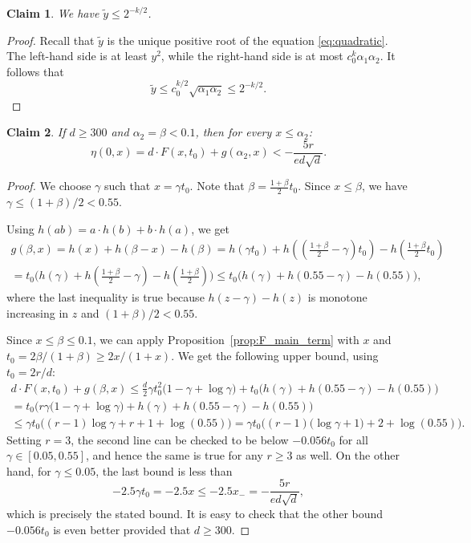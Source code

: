\documentclass[12pt]{amsart}
\newtheorem*{claim*}{Claim}
\theoremstyle{definition}
\newcommand\yt{\widetilde{y}}
\newcommand\al{\alpha}
\newcommand\be{\beta}
\newcommand\ga{\gamma}
\begin{document}
%
\begin{claim*}
We have $\yt \leq 2^{-k/2}$.
\end{claim*}
%
\begin{proof}
Recall that $\yt$ is the unique positive root of the equation \eqref{eq:quadratic}. The left-hand side is at least $y^2$, while the right-hand side is at most $c_0^k \al_1 \al_2$. It follows that 
%
\[ \yt \leq c_0^{k/2} \sqrt{\al_1 \al_2} \leq 2^{-k/2} .\]
%
\end{proof}
%
\begin{claim*}
If $d \geq 300$ and $\al_2=\be < 0.1$, then for every $x \leq \al_2$:
\[ \eta(0,x) = d \cdot F(x,t_0) + g(\al_2,x)
< - \frac{5r}{e d\sqrt{d}} .\]
\end{claim*}
%
\begin{proof}
We choose $\ga$ such that $x = \ga t_0$. Note that $\be= \frac{1+\be}{2} t_0$. Since $x\leq \be$, we have $\ga \leq (1+\be)/2 < 0.55$. 

Using $h(ab)=a \cdot h(b) + b \cdot h(a)$, we get 
%
\begin{multline*}
g(\be,x) = h(x)+h(\be-x)-h(\be)  
= h(\ga t_0)
+ h\left( \left(\frac{1+\be}{2}-\ga\right)t_0 \right)
- h\left( \frac{1+\be}{2} t_0 \right) \\
= t_0 \bigg( h(\ga)
+h\left(\frac{1+\be}{2}-\ga\right)
-h\left(\frac{1+\be}{2}\right) \bigg) 
\leq t_0 \bigg( h(\ga)
+h\left(0.55-\ga\right)
-h\left(0.55\right) \bigg) ,
\end{multline*}
%
where the last inequality is true because $h(z-\ga)-h(z)$ is monotone increasing in $z$ and $(1+\be)/2 < 0.55$.

Since $x \leq \be \leq 0.1$, we can apply Proposition~\ref{prop:F_main_term} with $x$ and $t_0=2\be/(1+\be) \geq 2x/(1+x)$. We get the following upper bound, using $t_0=2r/d$:
%
\begin{multline*}
d \cdot F(x,t_0) + g(\be,x) \leq 
\frac{d}{2}\ga t_0^2 \big( 1- \ga + \log \ga \big) + 
t_0 \bigg( h(\ga)+h(0.55-\ga)-h(0.55) \bigg) \\
= t_0 \bigg( r\ga \big( 1- \ga + \log \ga \big) 
+ h(\ga)+h(0.55-\ga)-h(0.55) \bigg)\\ 
\leq \ga t_0 \bigg( (r-1)\log \ga + r +1+\log(0.55) \bigg) 
= \ga t_0 \bigg( (r-1)\big(\log \ga+1) + 2+\log(0.55) \bigg).
\end{multline*} 
%
Setting $r=3$, the second line can be checked to be below $-0.056 t_0$ for all $\ga \in [0.05,0.55]$, and hence the same is true for any $r \geq 3$ as well. On the other hand, for $\ga \leq 0.05$, the last bound is less than 
%
\[ -2.5 \ga t_0 = -2.5 x \leq -2.5 x_- = - \frac{5r}{e d\sqrt{d}} ,\]  
%
which is precisely the stated bound. It is easy to check that the other bound $-0.056 t_0$ is even better provided that $d \geq 300$.
\end{proof}
%
\end{document}
